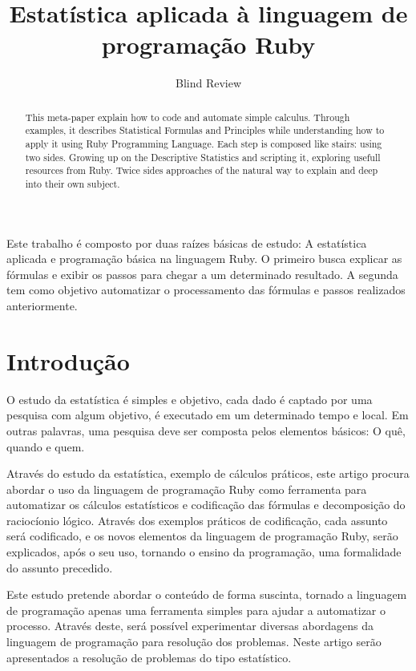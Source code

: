 \documentclass[12pt]{article}
\title{Estatística aplicada à linguagem de programação Ruby}
\author{Blind Review}
\begin{document}
\maketitle

\begin{abstract}
  This meta-paper explain how to code and automate simple calculus. 
  Through examples, it describes Statistical Formulas and Principles 
  while understanding how to apply it using Ruby Programming Language.
  Each step is composed like stairs: using two sides. Growing up on the
  Descriptive Statistics and scripting it, exploring usefull resources
  from Ruby. Twice sides approaches of the natural way to explain and 
  deep into their own subject.
\end{abstract}
     
\begin{resumo} 
  Este trabalho é composto por duas raízes básicas de estudo: A estatística 
  aplicada e programação básica na linguagem Ruby. O primeiro busca explicar
   as fórmulas e exibir os passos para chegar a um determinado resultado. 
  A segunda tem como objetivo automatizar o processamento das fórmulas e 
  passos realizados anteriormente.
\end{resumo}

\section{Introdução} \label{sec:firstpage}

O estudo da estatística é simples e objetivo, cada dado é captado por uma pesquisa com algum objetivo, é executado em um determinado tempo e local. Em outras palavras, uma pesquisa deve ser composta pelos elementos básicos: O quê, quando e quem.

Através do estudo da estatística, exemplo de cálculos práticos, este artigo procura abordar o uso da linguagem de programação Ruby como ferramenta para automatizar os cálculos estatísticos e codificação das fórmulas e decomposição do raciocíonio lógico. Através dos exemplos práticos de codificação, cada assunto será codificado, e os novos elementos da linguagem de programação Ruby, serão explicados, após o seu uso, tornando o ensino da programação, uma formalidade do assunto precedido.

Este estudo pretende abordar o conteúdo de forma suscinta, tornado a linguagem de programação apenas uma ferramenta simples para ajudar a automatizar o processo. Através deste, será possível experimentar diversas abordagens da linguagem de programação para resolução dos problemas. Neste artigo serão apresentados a resolução de problemas do tipo estatístico.
\end{document}
